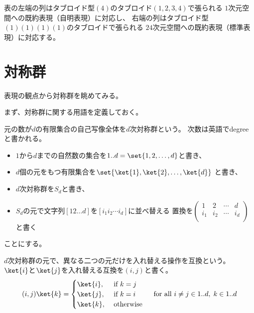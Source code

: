 	表の左端の列はタブロイド型$(4)$のタブロイド$(1,2,3,4)$で張られる
	$1$次元空間への既約表現（自明表現）に対応し、
	右端の列はタブロイド型$(1)(1)(1)(1)$のタブロイドで張られる
	$24$次元空間への既約表現（標準表現）に対応する。

\section{対称群}\label{s1:対称群} %
	表現の観点から対称群を眺めてみる。

	まず、対称群に関する用語を定義しておく。

	\begin{definition}[対称群]\label{def:対称群} %
		元の数が$d$の有限集合の自己写像全体を$d$次対称群という。
		次数は英語でdegreeと書かれる。
	\end{definition} %

	\begin{itemize}\setlength{\itemsep}{-1mm} %
		\item $1$から$d$までの自然数の集合を$1..d=\set{1,2,\dots,d}$と書き、
		\item $d$個の元をもつ有限集合を$\set{\ket{1},\ket{2},\dots,\ket{d}}$
		と書き、
		\item $d$次対称群を$S_d$と書き、
		\item $S_d$の元で文字列$[12\dots d]$を$[i_1i_2\cdots i_d]$に並べ替える
		置換を$\begin{pmatrix}
			1 & 2 & \cdots & d \\
			i_1 & i_2 & \cdots & i_d \\
		\end{pmatrix}
		$と書く
	\end{itemize} %
	ことにする。

	\begin{definition}[互換（transposition）]\label{def:互換} %
		$d$次対称群の元で、異なる二つの元だけを入れ替える操作を互換という。
		$\ket{i}$と$\ket{j}$を入れ替える互換を$(i,j)$と書く。
		\begin{equation*}\begin{split} %
			(i,j)\ket{k} = \begin{cases} %
				\ket{i}, &\text{ if }k=j \\
				\ket{j}, &\text{ if }k=i \\
				\ket{k}, &\text{ otherwise } \\
			\end{cases} %
			\quad\text{for all }i\neq j\in1..d,\;k\in 1..d
		\end{split}\end{equation*} %
	\end{definition} %

